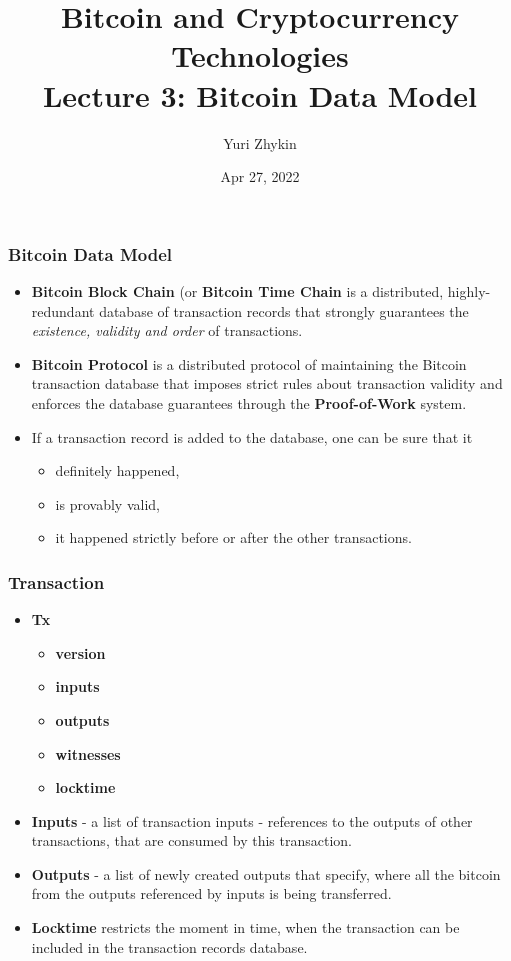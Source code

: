 \documentclass{beamer}
\title{
  Bitcoin and Cryptocurrency Technologies \\
  Lecture 3: Bitcoin Data Model
}
\author{Yuri Zhykin}
\date{Apr 27, 2022}
\begin{document}
\frame{\titlepage}

\begin{frame}
  \frametitle{Bitcoin Data Model}
  \begin{itemize}
  \item \textbf{Bitcoin Block Chain} (or \textbf{Bitcoin Time Chain} is a
    distributed, highly-redundant database of transaction records that strongly
    guarantees the \textit{existence, validity and order} of transactions.
  \item \textbf{Bitcoin Protocol} is a distributed protocol of maintaining the
    Bitcoin transaction database that imposes strict rules about transaction
    validity and enforces the database guarantees through the
    \textbf{Proof-of-Work} system.
  \item If a transaction record is added to the database, one can be sure that
    it 
    \begin{itemize}
    \item definitely happened,
    \item is provably valid,
    \item it happened strictly before or after the other transactions.
    \end{itemize}
  \end{itemize}
\end{frame}

\begin{frame}
  \frametitle{Transaction}
  \begin{itemize}
  \item \textbf{Tx}
    \begin{itemize}
    \item \textbf{version}
    \item \textbf{inputs}
    \item \textbf{outputs}
    \item \textbf{witnesses}
    \item \textbf{locktime}
    \end{itemize}
  \item \textbf{Inputs} - a list of transaction inputs - references to the
    outputs of other transactions, that are consumed by this transaction.
  \item \textbf{Outputs} - a list of newly created outputs that specify, where
    all the bitcoin from the outputs referenced by inputs is being transferred.
  \item \textbf{Locktime} restricts the moment in time, when the transaction can
    be included in the transaction records database.
  \end{itemize}
\end{frame}
\end{document}
